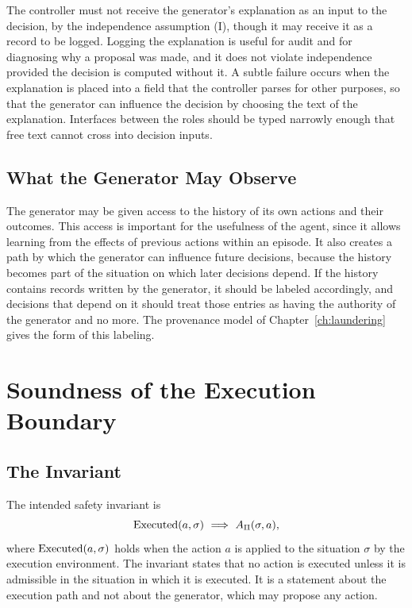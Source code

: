 The controller must not receive the generator's explanation as an input to the decision, by the independence assumption (I), though it may receive it as a record to be logged. Logging the explanation is useful for audit and for diagnosing why a proposal was made, and it does not violate independence provided the decision is computed without it. A subtle failure occurs when the explanation is placed into a field that the controller parses for other purposes, so that the generator can influence the decision by choosing the text of the explanation. Interfaces between the roles should be typed narrowly enough that free text cannot cross into decision inputs.

\section{What the Generator May Observe}

The generator may be given access to the history of its own actions and their outcomes. This access is important for the usefulness of the agent, since it allows learning from the effects of previous actions within an episode. It also creates a path by which the generator can influence future decisions, because the history becomes part of the situation on which later decisions depend. If the history contains records written by the generator, it should be labeled accordingly, and decisions that depend on it should treat those entries as having the authority of the generator and no more. The provenance model of Chapter~\ref{ch:laundering} gives the form of this labeling.

\chapter{Soundness of the Execution Boundary}
\label{ch:soundness}

\section{The Invariant}

The intended safety invariant is
\begin{equation}\label{eq:invariant}
\operatorname{Executed}(a,\sigma)\ \Longrightarrow\ A_\Pi(\sigma,a),
\end{equation}
where $\operatorname{Executed}(a,\sigma)$ holds when the action $a$ is applied to the situation $\sigma$ by the execution environment. The invariant states that no action is executed unless it is admissible in the situation in which it is executed. It is a statement about the execution path and not about the generator, which may propose any action.

